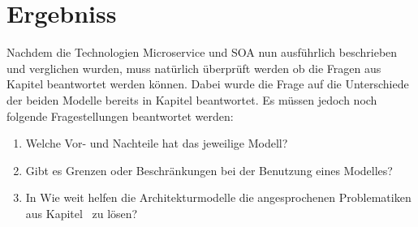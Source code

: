 \chapter{Ergebniss}
\label{chap:Ergebniss}
Nachdem die Technologien Microservice und SOA nun ausführlich beschrieben und verglichen wurden, muss natürlich überprüft werden ob die Fragen aus Kapitel  beantwortet werden können. Dabei wurde die Frage auf die Unterschiede der beiden Modelle bereits in Kapitel  beantwortet. Es müssen jedoch noch folgende Fragestellungen beantwortet werden:

\begin{enumerate}
    \item Welche Vor- und Nachteile hat das jeweilige Modell?
    \item Gibt es Grenzen oder Beschränkungen bei der Benutzung eines Modelles?
    \item In Wie weit helfen die Architekturmodelle die angesprochenen Problematiken aus Kapitel \ zu lösen?
\end{enumerate}


